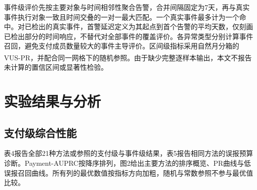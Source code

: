 \documentclass[twocolumn,11pt]{ctexart}
\newcommand{\upcite}[1]{\textsuperscript{\cite{#1}}}
\begin{document}
事件级评价先按主要对象与时间相邻性聚合告警，合并间隔固定为7天，再与真实事件执行对象一致且时间交叠的一对一最大匹配。一个真实事件最多计为一个命中。对已检出的真实事件，首警延迟定义为其起点到首个告警的平均天数，仅刻画已检出部分的时间响应，不替代对全部事件的覆盖评价。各异常类型分别计算事件召回，避免支付成员数量较大的事件主导评价。区间级指标采用自然月分箱的VUS-PR，并配合同一网格下的随机参照\upcite{ref20}。由于缺少完整逐样本输出，本文不报告未计算的置信区间或显著性检验。

\section{实验结果与分析}
\subsection{支付级综合性能}
表4报告全部21种方法或参照的支付级与事件级结果，表5报告相同方法的误报预算诊断。Payment-AUPRC按降序排列，图2给出主要方法的排序概览、PR曲线与低误报召回曲线。所有列的最优数值按指标方向加粗，随机与常数参照不参与最优值比较。
\end{document}
